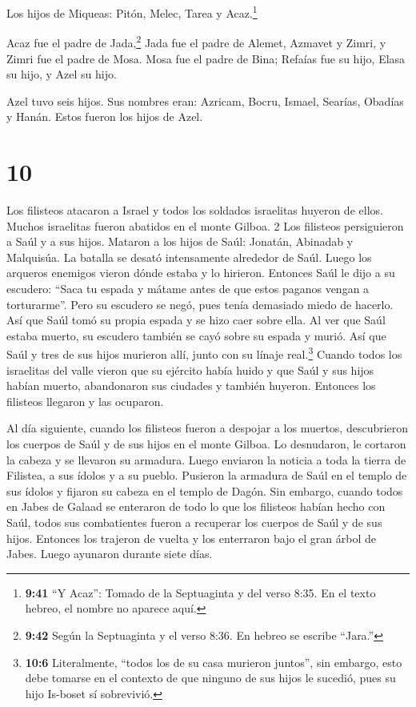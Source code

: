  Los hijos de Miqueas: Pitón, Melec, Tarea y
Acaz.\footnote{\textbf{9:41} ``Y Acaz'': Tomado de la Septuaginta y del
  verso 8:35. En el texto hebreo, el nombre no aparece aquí.}

 Acaz fue el padre de Jada,\footnote{\textbf{9:42} Según la
  Septuaginta y el verso 8:36. En hebreo se escribe ``Jara.''} Jada fue
el padre de Alemet, Azmavet y Zimri, y Zimri fue el padre de Mosa.
 Mosa fue el padre de Bina; Refaías fue su hijo, Elasa su
hijo, y Azel su hijo.

 Azel tuvo seis hijos. Sus nombres eran: Azricam, Bocru,
Ismael, Searías, Obadías y Hanán. Estos fueron los hijos de Azel.

\hypertarget{section-9}{%
\section{10}\label{section-9}}

 Los filisteos atacaron a Israel y todos los soldados
israelitas huyeron de ellos. Muchos israelitas fueron abatidos en el
monte Gilboa. 2 Los filisteos persiguieron a Saúl y a sus hijos. Mataron
a los hijos de Saúl: Jonatán, Abinadab y Malquisúa.  La
batalla se desató intensamente alrededor de Saúl. Luego los arqueros
enemigos vieron dónde estaba y lo hirieron.  Entonces Saúl
le dijo a su escudero: ``Saca tu espada y mátame antes de que estos
paganos vengan a torturarme''. Pero su escudero se negó, pues tenía
demasiado miedo de hacerlo. Así que Saúl tomó su propia espada y se hizo
caer sobre ella.  Al ver que Saúl estaba muerto, su escudero
también se cayó sobre su espada y murió.  Así que Saúl y
tres de sus hijos murieron allí, junto con su línaje real.\footnote{\textbf{10:6}
  Literalmente, ``todos los de su casa murieron juntos'', sin embargo,
  esto debe tomarse en el contexto de que ninguno de sus hijos le
  sucedió, pues su hijo Is-boset sí sobrevivió.}  Cuando
todos los israelitas del valle vieron que su ejército había huido y que
Saúl y sus hijos habían muerto, abandonaron sus ciudades y también
huyeron. Entonces los filisteos llegaron y las ocuparon.

 Al día siguiente, cuando los filisteos fueron a despojar a
los muertos, descubrieron los cuerpos de Saúl y de sus hijos en el monte
Gilboa.  Lo desnudaron, le cortaron la cabeza y se llevaron
su armadura. Luego enviaron la noticia a toda la tierra de Filistea, a
sus ídolos y a su pueblo.  Pusieron la armadura de Saúl en
el templo de sus ídolos y fijaron su cabeza en el templo de Dagón.
 Sin embargo, cuando todos en Jabes de Galaad se enteraron
de todo lo que los filisteos habían hecho con Saúl,  todos
sus combatientes fueron a recuperar los cuerpos de Saúl y de sus hijos.
Entonces los trajeron de vuelta y los enterraron bajo el gran árbol de
Jabes. Luego ayunaron durante siete días.

